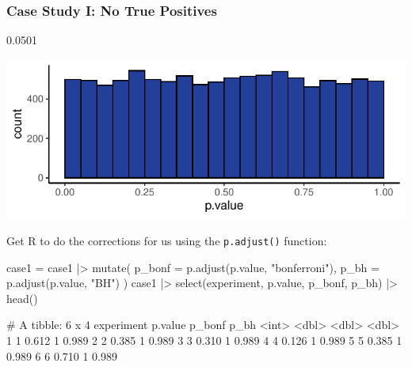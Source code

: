 \documentclass[a4paper]{article}
\begin{document}
\subsubsection{Case Study I: No True Positives}
\begin{Schunk}
\begin{Soutput}
[1] 0.0501
\end{Soutput}


{\centering \includegraphics[width=\maxwidth]{figure/listings-unnamed-chunk-213-1} 

}

\end{Schunk}
Get R to do the corrections for us using the \lstinline|p.adjust()| function:
\begin{Schunk}
\begin{Sinput}
case1 = case1 |> 
  mutate(
    p_bonf = p.adjust(p.value, 
                      "bonferroni"),
    p_bh = p.adjust(p.value, "BH")
  )
case1 |> select(experiment, p.value,
                 p_bonf, p_bh) |> 
  head()
\end{Sinput}
\begin{Soutput}
# A tibble: 6 x 4
  experiment p.value p_bonf  p_bh
       <int>   <dbl>  <dbl> <dbl>
1          1   0.612      1 0.989
2          2   0.385      1 0.989
3          3   0.310      1 0.989
4          4   0.126      1 0.989
5          5   0.385      1 0.989
6          6   0.710      1 0.989
\end{Soutput}
\end{Schunk}
\end{document}
